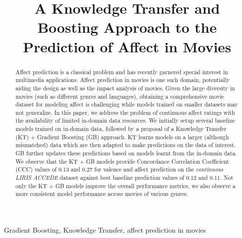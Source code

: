 \documentclass{article}
\title{A Knowledge Transfer and Boosting Approach to the Prediction of Affect in Movies}
\begin{document}
\ninept
%
\maketitle
%
\begin{abstract}
Affect prediction is a classical problem and has recently garnered special interest in multimedia applications. 
Affect prediction in movies is one such domain, potentially aiding the design as well as the impact analysis of movies.
Given the large diversity in movies (such as different genres and languages), obtaining a comprehensive movie dataset for modeling affect is challenging while models trained on smaller datasets may not generalize. 
In this paper, we address the problem of continuous affect ratings with the availability of limited in-domain data resources. 
We initially setup several baseline models trained on in-domain data, followed by a proposal of a Knowledge Transfer (KT) + Gradient Boosting (GB) approach.
KT learns models on a larger (although mismatched) data which are then adapted to make predictions on the data of interest. 
GB further updates these predictions based on models learnt from the in-domain data.
We observe that the KT + GB models provide Concordance Correlation Coefficient (CCC) values of 0.13 and 0.27 for valence and affect prediction on the {\it continuous LIRIS ACCEDE} dataset against best baseline prediction values of 0.12 and 0.11. 
Not only the KT + GB models improve the overall performance metrics, we also observe a more consistent model performance across movies of various genres. 
 
\end{abstract}
%
\begin{keywords}
Gradient Boosting, Knowledge Transfer, affect prediction in movies 
\end{keywords}
%
\end{document}
